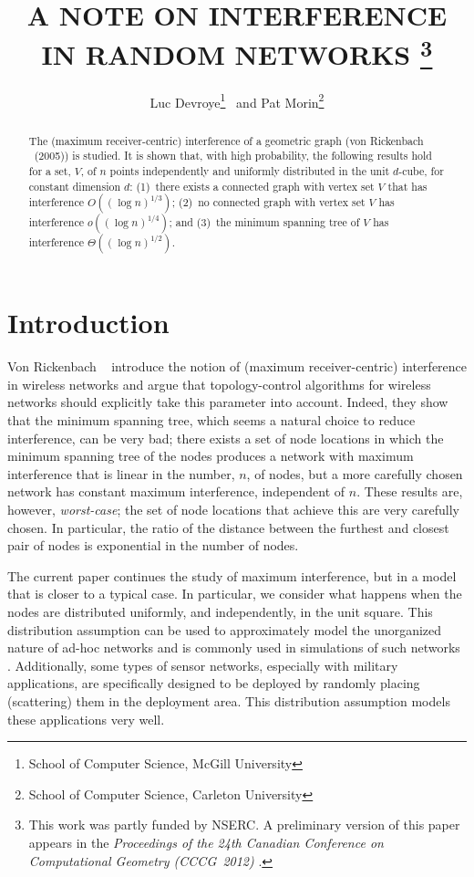 \documentclass{patmorin}
\title{\MakeTextUppercase{A Note on Interference in Random Networks}%
   \thanks{This work was partly funded by NSERC. A preliminary version
    of this paper appears in the \emph{Proceedings of the 24th Canadian Conference on Computational Geometry (CCCG~2012)} \cite{devroye.morin:note}.}}
\author{Luc Devroye\thanks{School of Computer Science, McGill University}
        \ and
        Pat Morin\thanks{School of Computer Science, Carleton University}}
\begin{document}
\maketitle

\begin{abstract}
  The (maximum receiver-centric) interference of a geometric graph
  (von Rickenbach \etal\ (2005)) is studied.  It is shown that,
  with high probability, the following results hold for a set, $V$,
  of $n$ points independently and uniformly distributed in the unit
  $d$-cube, for constant dimension $d$: (1)~there exists a connected
  graph with vertex set $V$ that has interference $O((\log n)^{1/3})$;
  (2)~no connected graph with vertex set $V$ has interference $o((\log
  n)^{1/4})$; and (3)~the minimum spanning tree of $V$ has interference
  $\Theta((\log n)^{1/2})$.
\end{abstract}

\section{Introduction}

Von Rickenbach \etal\ \cite{vR05,rwz09} introduce the notion of (maximum
receiver-centric) interference in wireless networks and argue that
topology-control algorithms for wireless networks should explicitly take
this parameter into account.  Indeed, they show that the minimum spanning
tree, which seems a natural choice to reduce interference, can be very
bad; there exists a set of node locations in which the minimum spanning
tree of the nodes produces a network with maximum interference that is
linear in the number, $n$, of nodes, but a more carefully chosen network
has constant maximum interference, independent of $n$.  These results are,
however, \emph{worst-case}; the set of node locations that achieve this
are very carefully chosen.  In particular, the ratio of the distance
between the furthest and closest pair of nodes is exponential in the
number of nodes.

The current paper continues the study of maximum interference, but in a
model that is closer to a typical case.  In particular, we consider what
happens when the nodes are distributed uniformly, and independently,
in the unit square.  This distribution assumption can be used to
approximately model the unorganized nature of ad-hoc networks and is
commonly used in simulations of such networks \cite{tma09}. Additionally, some
types of sensor networks, especially with military applications, are
specifically designed to be deployed by randomly placing (scattering)
them in the deployment area. This distribution assumption models these
applications very well.
\end{document}
